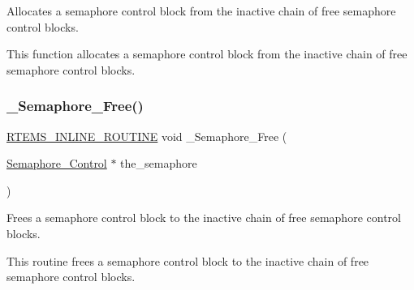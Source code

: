 Allocates a semaphore control block from the inactive chain of free semaphore control blocks. 

This function allocates a semaphore control block from the inactive chain of free semaphore control blocks. \mbox{\label{group__ClassicSemImpl_gaca8f9ddbc112fe16432cd255527af303}} 
\subsubsection{\texorpdfstring{\_Semaphore\_Free()}{\_Semaphore\_Free()}}
{\footnotesize\ttfamily \mbox{\hyperlink{group__RTEMSScoreBaseDefs_gac216239df231d5dbd15e3520b0b9313f}{R\+T\+E\+M\+S\+\_\+\+I\+N\+L\+I\+N\+E\+\_\+\+R\+O\+U\+T\+I\+NE}} void \+\_\+\+Semaphore\+\_\+\+Free (\begin{DoxyParamCaption}\item[{\mbox{\hyperlink{structSemaphore__Control}{Semaphore\+\_\+\+Control}} $\ast$}]{the\+\_\+semaphore }\end{DoxyParamCaption})}



Frees a semaphore control block to the inactive chain of free semaphore control blocks. 

This routine frees a semaphore control block to the inactive chain of free semaphore control blocks. 